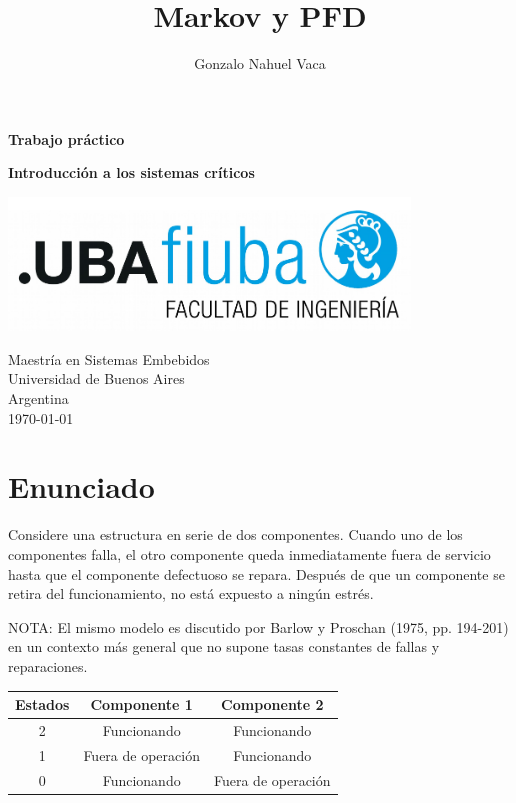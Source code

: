\documentclass[
    11pt,
    spanish,
    a4paper
]{article}
\title{Markov y PFD}
\author{Gonzalo Nahuel Vaca}
\def\doctype{Trabajo práctico}
\begin{document}
\makeatletter
\begin{titlepage}
	\begin{center}
		\vspace*{1cm}

		\Huge
		\textbf{\doctype}
		\vspace{0.5cm}

		\LARGE
		\@title
		\vspace{0.5cm}

		\textbf{Introducción a los sistemas críticos}

		\vspace{1.5cm}

		\textbf{\@author}

		\vspace{1.5cm}

		\includegraphics[width=0.8\textwidth]{img/logoFIUBA.pdf}

		\vfill
		Maestría en Sistemas Embebidos\\
		Universidad de Buenos Aires\\
		Argentina\\
		\today
	\end{center}
\end{titlepage}
\makeatother
\newpage

\section{Enunciado}

Considere una estructura en serie de dos componentes. Cuando uno de los componentes falla, el otro
componente queda inmediatamente fuera de servicio hasta que el componente defectuoso se repara.
Después de que un componente se retira del funcionamiento, no está expuesto a ningún estrés.

NOTA: El mismo modelo es discutido por Barlow y Proschan (1975, pp. 194-201) en un contexto más general que no
supone tasas constantes de fallas y reparaciones.

\begin{center}
	\begin{tabular}{c c c}
		\hline
		Estados & Componente 1       & Componente 2       \\
		\hline
		2       & Funcionando        & Funcionando        \\
		1       & Fuera de operación & Funcionando        \\
		0       & Funcionando        & Fuera de operación \\
		\hline
	\end{tabular}
\end{center}
\end{document}
